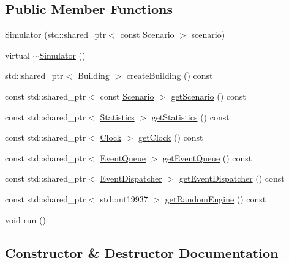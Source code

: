 \subsection*{Public Member Functions}
\begin{DoxyCompactItemize}
\item 
\hyperlink{class_simulator_af08bb3d35eeea230fa542b0a4ad8c59c}{Simulator} (std\+::shared\+\_\+ptr$<$ const \hyperlink{class_scenario}{Scenario} $>$ scenario)
\item 
virtual \hyperlink{class_simulator_a0f49aa04f42060a785adf77346b9de9f}{$\sim$\+Simulator} ()
\item 
std\+::shared\+\_\+ptr$<$ \hyperlink{class_building}{Building} $>$ \hyperlink{class_simulator_a7a8ed7267e6892f0d16c9ffe8b16a353}{create\+Building} () const 
\item 
const std\+::shared\+\_\+ptr$<$ const \hyperlink{class_scenario}{Scenario} $>$ \hyperlink{class_simulator_a2208fa4322cb3f2ffaad7da74ccd3105}{get\+Scenario} () const 
\item 
const std\+::shared\+\_\+ptr$<$ \hyperlink{class_statistics}{Statistics} $>$ \hyperlink{class_simulator_a09274dd8a739eee218a07cea43986b97}{get\+Statistics} () const 
\item 
const std\+::shared\+\_\+ptr$<$ \hyperlink{class_clock}{Clock} $>$ \hyperlink{class_simulator_ab23554f6835357b14ec6a214dbf976c9}{get\+Clock} () const 
\item 
const std\+::shared\+\_\+ptr$<$ \hyperlink{class_event_queue}{Event\+Queue} $>$ \hyperlink{class_simulator_a3b94c9842b8d92c0fd06133eaadb0586}{get\+Event\+Queue} () const 
\item 
const std\+::shared\+\_\+ptr$<$ \hyperlink{class_event_dispatcher}{Event\+Dispatcher} $>$ \hyperlink{class_simulator_a6a422e763047b283c46063faeb24a3a9}{get\+Event\+Dispatcher} () const 
\item 
const std\+::shared\+\_\+ptr$<$ std\+::mt19937 $>$ \hyperlink{class_simulator_a380f732c8ecd0f9c5536519cce7a5ebd}{get\+Random\+Engine} () const 
\item 
void \hyperlink{class_simulator_aa2de7e32b04cc3e8fc60aec23997621b}{run} ()
\end{DoxyCompactItemize}


\subsection{Constructor \& Destructor Documentation}
\hypertarget{class_simulator_af08bb3d35eeea230fa542b0a4ad8c59c}{}
